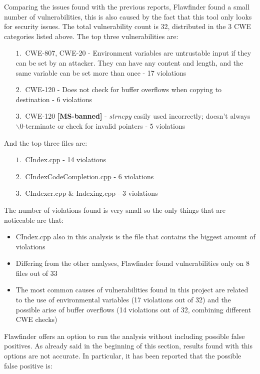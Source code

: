 Comparing the issues found with the previous reports, Flawfinder found a small number of vulnerabilities, this is also caused by the fact that this tool only looks for security issues.\newline
The total vulnerability count is 32, distributed in the 3 CWE categories listed above.\newline
The top three vulnerabilities are:
	\begin{itemize}
		\item[$1.\:$] CWE-807, CWE-20 - Environment variables are untrustable input if they can be set by an attacker. They can have any content and length, and the same variable can be set more than once - 17 violations
		\item[$2.\:$] CWE-120 - Does not check for buffer overflows when copying to destination - 6 violations
		\item[$3.\:$] CWE-120 \textbf{[MS-banned]} - \textsl{strncpy} easily used incorrectly; doesn't always $\backslash0$-terminate or check for invalid pointers - 5 violations
	\end{itemize}

And the top three files are:

\begin{itemize}
		\item[$1.\:$] CIndex.cpp - 14 violations
		\item[$2.\:$] CIndexCodeCompletion.cpp - 6 violations
		\item[$3.\:$] CIndexer.cpp \& Indexing.cpp - 3 violations
\end{itemize}

The number of violations found is very small so the only things that are noticeable are that:
\begin{itemize}
		\item CIndex.cpp also in this analysis is the file that contains the biggest amount of violations
		\item Differing from the other analyses, Flawfinder found vulnerabilities only on 8 files out of 33
		\item The most common causes of vulnerabilities found in this project are related to the use of environmental variables (17 violations out of 32) and the possible arise of buffer overflows (14 violations out of 32, combining different CWE checks)
\end{itemize}

Flawfinder offers an option to run the analysis without including possible false positives.\newline
As already said in the beginning of this section, results found with this options are not accurate. In particular, it has been reported that the possible false positive is:


